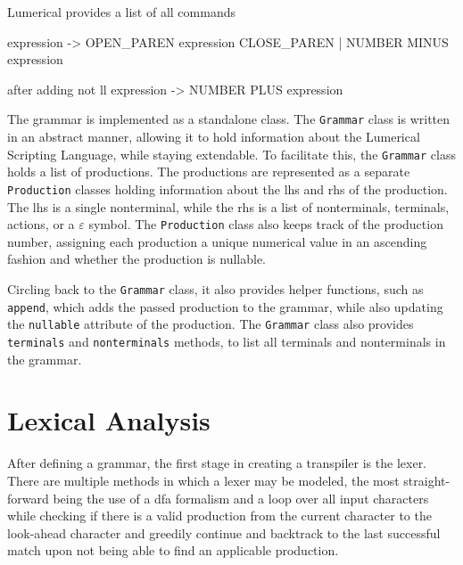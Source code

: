 Lumerical provides a list of all commands \cite{ansys_lsf_commands}


 expression -> OPEN\_PAREN expression CLOSE\_PAREN
            |  NUMBER MINUS expression

after adding not ll
 expression -> NUMBER PLUS expression




The grammar is implemented as a standalone class. The \texttt{Grammar} class is written in an abstract manner, allowing it to hold information about the Lumerical Scripting Language, while staying extendable. To facilitate this, the \texttt{Grammar} class holds a list of productions. The productions are represented as a separate \texttt{Production} classes holding information about the \gls{lhs} and \gls{rhs} of the production. The \gls{lhs} is a single nonterminal, while the \gls{rhs} is a list of nonterminals, terminals, actions, or a $\varepsilon$ symbol. The \texttt{Production} class also keeps track of the production number, assigning each production a unique numerical value in an ascending fashion and whether the production is nullable.

Circling back to the \texttt{Grammar} class, it also provides helper functions, such as \texttt{append}, which adds the passed production to the grammar, while also updating the \texttt{nullable} attribute of the production. The \texttt{Grammar} class also provides \texttt{terminals} and \texttt{nonterminals} methods, to list all terminals and nonterminals in the grammar.


\section{Lexical Analysis}
After defining a grammar, the first stage in creating a transpiler is the lexer. There are multiple methods in which a lexer may be modeled, the most straight-forward being the use of a \gls{dfa} formalism and a loop over all input characters while checking if there is a valid production from the current character to the look-ahead character and greedily continue and backtrack to the last successful match upon not being able to find an applicable production.

